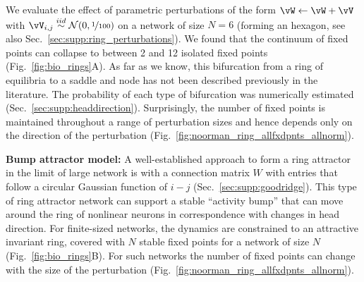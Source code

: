\documentclass{article} %
\newcommand{\ptitle}[1]{\textbf{#1:}\xspace}
\newcounter{ct}
\newcommand{\iidsample}{\stackrel{iid}{\sim}}
\theoremstyle{definition}
\theoremstyle{remark}
\begin{document}
We evaluate the effect of parametric perturbations of the form \( \vW \leftarrow \vW + \vV\) with \(\vV_{i, j}\iidsample\mathcal{N}(0,\nicefrac{1}{100})\) on a network of size \(N = 6\) (forming an hexagon, see also Sec.~\ref{sec:supp:ring_perturbations}). %
We found that the continuum of fixed points can collapse to between 2 and 12 isolated fixed points (Fig.~\ref{fig:bio_rings}A).
As far as we know, this bifurcation from a ring of equilibria to a saddle and node has not been described previously in the literature.
The probability of each type of bifurcation was numerically estimated (Sec.~\ref{sec:supp:headdirection}).
Surprisingly, the number of fixed points is maintained throughout a range of perturbation sizes and hence depends only on the direction of the perturbation (Fig.~\ref{fig:noorman_ring_allfxdpnts_allnorm}).



\ptitle{Bump attractor model}
A well-established approach to form a ring attractor in the limit of large network is with a connection matrix \(W\) with entries that follow a circular Gaussian function of \(i - j\)\citep{seeholzer2017efficient,redish1996coupled,goodridge2000,compte2000synaptic} (Sec.~\ref{sec:supp:goodridge}).
This type of ring attractor network can support a stable ``activity bump'' that can move around the ring of nonlinear neurons in correspondence with changes in head direction\citep{kakaria2017}.
For finite-sized networks, the dynamics are constrained to an attractive invariant ring, covered with \(N\) stable fixed points for a network of size \(N\) (Fig.~\ref{fig:bio_rings}B).
For such networks the number of fixed points can change with the size of the perturbation (Fig.~\ref{fig:noorman_ring_allfxdpnts_allnorm}).
\end{document}
